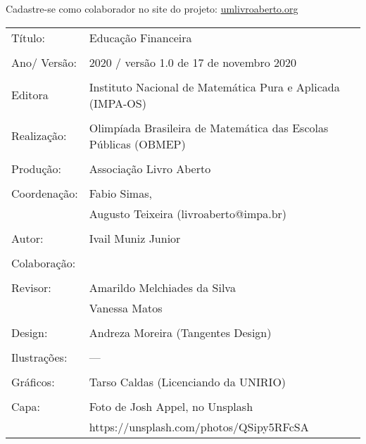 \vspace*{.3cm}

Cadastre-se como colaborador no site do projeto: \url{umlivroaberto.org}




\begin{tabular}{p{}p{}}
Título: & Educação Financeira\\
\\
Ano/ Versão: & 2020 / versão 1.0 de 17 de novembro 2020\\
\\
Editora & Instituto Nacional de Matem\'atica Pura e Aplicada (IMPA-OS)\\
\\
Realização:& Olimp\'iada Brasileira de Matem\'atica das Escolas P\'ublicas (OBMEP)\\
\\
Produção:& Associação Livro Aberto\\
\\
Coordenação: & Fabio Simas, \\
			&  Augusto Teixeira (livroaberto@impa.br)\\
\\
  Autor: & Ivail Muniz Junior\\
        
\\
Colaboração: & \\
\\
Revisor: & Amarildo Melchiades da Silva \\
         & Vanessa Matos \\
\\
Design: & Andreza Moreira (Tangentes Design) \\
\\
  Ilustrações: & --- \\ 
\\
Gráficos: & Tarso Caldas (Licenciando da UNIRIO)\\
\\
  Capa: & Foto de Josh Appel, no Unsplash \\
  		& https://unsplash.com/photos/QSipy5RFcSA \\

\end{tabular}
\vspace{.5cm}



